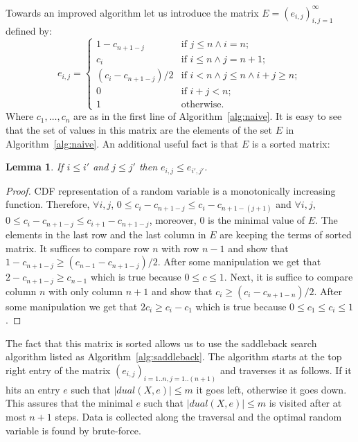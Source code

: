 \documentclass[letterpaper]{article} %
\newtheorem{lemma}[thm]{Lemma}
\begin{document}
Towards an improved algorithm let us introduce the matrix $E=(e_{i,j})_{i,j=1}^\infty$ defined by:
	$$e_{i,j} = \begin{cases}
	1-c_{n+1-j}   & \text{if } j \leq n \wedge  i = n ; \\
	c_i & \text{if } i \leq n \wedge  j = n + 1; \\
	( c_i - c_{n+1-j})/2  & \text{if } i < n \wedge j \leq n \wedge i{+}j\geq n; \\
	0  & \text{if }  i{+}j < n; \\
	1  & \text{otherwise}.
	\end{cases}$$
Where $c_1,\dots,c_n$ are as in the first line of Algorithm~\ref{alg:naive}. It is easy to see that the set of values in this matrix are the elements of the set $E$ in Algorithm~\ref{alg:naive}. An additional useful fact is that $E$ is a sorted matrix:
\begin{lemma}\label{the:sortedMatrix}
	If $i\leq i'$ and $j\leq j'$ then $e_{i,j}\leq e_{i',j'}$.
\end{lemma}
\begin{proof}
CDF representation of a random variable is a monotonically increasing function. Therefore, $\forall i,j$, $ 0\leq c_i - c_{n+1-j}\leq c_i - c_{n+1-(j+1)} $ and $ \forall i,j$, $0 \leq c_i - c_{n+1-j}\leq c_{i+1} - c_{n+1-j} $, moreover, 0 is the minimal value of $E$. The elements in the last row and the last column in $E$ are keeping the terms of sorted matrix. It suffices to compare row $n$ with row $n-1$ and show that $1-c_{n+1-j}\geq ( c_{n-1} - c_{n+1-j})/2$. After some manipulation we get that $2-c_{n+1-j}\geq c_{n-1}$ which is true because $0 \leq c\leq 1$. Next, it is suffice to compare column $n$ with only column $n+1$ and show that $c_i\geq ( c_{i} - c_{n+1-n})/2$. After some manipulation we get that $2c_i\geq c_{i}-c_1$ which is true because $0 \leq c_1 \leq c_i\leq 1$.
\end{proof}

The fact that this matrix is sorted allows us to use the saddleback search algorithm listed as Algorithm~\ref{alg:saddleback}. The algorithm starts at the top right entry of the matrix $(e_{i,j})_{i=1..n,j=1..(n+1)}$ and traverses it as follows. If it hits an entry $e$ such that $|dual(X,e)| \leq m$ it goes left, otherwise it goes down. This assures that the minimal $e$ such that $|dual(X,e)| \leq m$ is visited after at most $n+1$ steps. Data is collected along the traversal and the optimal random variable is found by brute-force.
\end{document}
